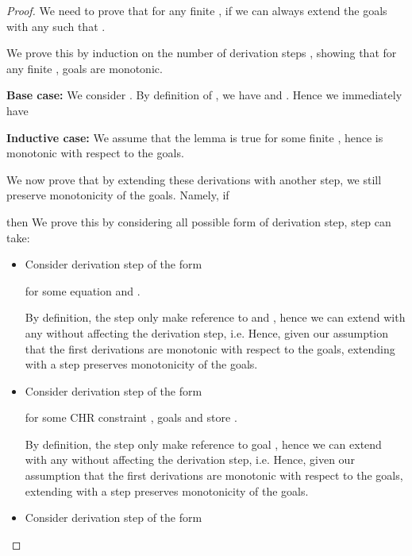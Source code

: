 \documentclass{tlp}
\begin{document}
\begin{proof}
  We need to prove that for any finite , if 
  we can always extend the goals with any  such that 
  .

  We prove this by induction on the number of derivation steps , showing that for any finite
  , goals are monotonic.
  
  {\bf Base case:} We consider . By
  definition of , we have  and . Hence we immediately
  have 
  
  {\bf Inductive case:} We assume that the lemma is true for some finite ,
  hence  is monotonic with respect
  to the goals.
  
  We now prove that by extending these  derivations with another step, 
  we still preserve monotonicity of the goals. Namely, if
  
  then 
  We prove this by considering all possible form of derivation step, step  can take:
  \begin{itemize}
	  \item {} Consider  derivation step of the form 
	        
	        for some equation  and .
	        
	        By definition, the  step only make reference to  and , hence we can
	        extend  with any  without affecting the derivation step, i.e.
	           \goaltrans 
	        \eda
	        Hence, given our assumption that the first  derivations are monotonic with respect
          to the goals,	extending with a   step preserves monotonicity
          of the goals. 
	  \item {} Consider  derivation step of the form 
	        
	        for some CHR constraint , goals  and store .
	        
	        By definition, the  step only make reference to goal , hence we can
	        extend  with any  without affecting the derivation step, i.e.
	           \goaltrans 
	        \eda
	        Hence, given our assumption that the first  derivations are monotonic with respect
          to the goals,	extending with a   step preserves monotonicity
          of the goals. 
	  \item {} Consider  derivation step of the form 
	        

\end{itemize}
\end{proof}
\end{document}
